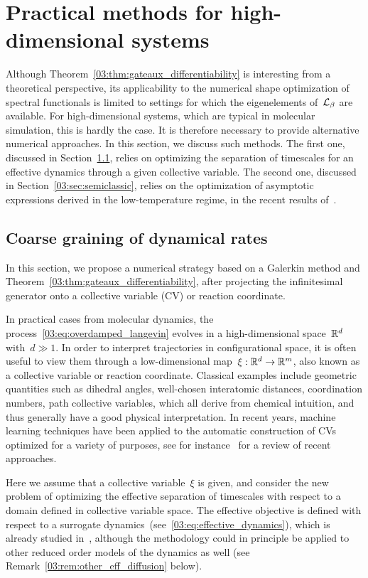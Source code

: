 \section{Practical methods for high-dimensional systems}
\label{03:sec:practical_opt}
Although Theorem~\ref{03:thm:gateaux_differentiability} is interesting from a theoretical perspective, its applicability to the numerical shape optimization of spectral functionals is limited to settings for which the eigenelements of~$\mathcal{L}_\beta$ are available.
For high-dimensional systems, which are typical in molecular simulation, this is hardly the case. It is therefore necessary to provide alternative numerical approaches.
In this section, we discuss such methods. The first one, discussed in Section~\ref{03:sec:coarse_graining}, relies on optimizing the separation of timescales for an effective dynamics through a given collective variable. 
The second one, discussed in Section~\ref{03:sec:semiclassic}, relies on the optimization of asymptotic expressions derived in the low-temperature regime, in the recent results of~\cite{BLS25a}.
\subsection{Coarse graining of dynamical rates}
    \label{03:sec:coarse_graining}
    In this section, we propose a numerical strategy based on a Galerkin method and Theorem~\ref{03:thm:gateaux_differentiability}, after projecting the infinitesimal generator onto a collective variable (CV) or reaction coordinate.

    In practical cases from molecular dynamics, the process~\eqref{03:eq:overdamped_langevin} evolves in a high-dimensional space~$\mathbb{R}^d$ with~$d\gg 1$. In order to interpret trajectories in configurational space, it is often useful to view them through a low-dimensional map~$\xi:\mathbb{R}^d\to\mathbb{R}^m$, also known as a collective variable or reaction coordinate.
    Classical examples include geometric quantities such as dihedral angles, well-chosen interatomic distances, coordination numbers, path collective variables, which all derive from chemical intuition, and thus generally have a good physical interpretation.
    In recent years, machine learning techniques have been applied to the automatic construction of CVs optimized for a variety of purposes, see for instance~\cite{F18,GSal20,C21,GHRCNL21} for a review of recent approaches.

    Here we assume that a collective variable~$\xi$ is given, and consider the new problem of optimizing the effective separation of timescales with respect to a domain defined in collective variable space.
    The effective objective is defined with respect to a surrogate dynamics~(see~\eqref{03:eq:effective_dynamics}), which is already studied in~\cite{LL10,ZHS16,NKBC21}, although the methodology could in principle be applied to other reduced order models of the dynamics as well (see Remark~\ref{03:rem:other_eff_diffusion} below).

